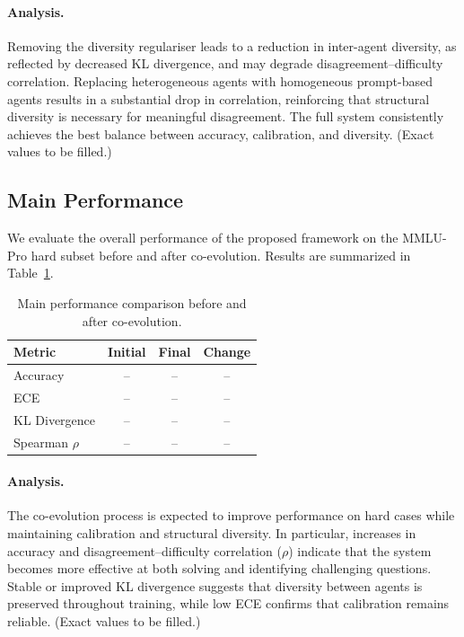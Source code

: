\documentclass{article}
\begin{document}
\paragraph{Analysis.}
Removing the diversity regulariser leads to a reduction in inter-agent diversity, as reflected by decreased KL divergence, and may degrade disagreement–difficulty correlation. Replacing heterogeneous agents with homogeneous prompt-based agents results in a substantial drop in correlation, reinforcing that structural diversity is necessary for meaningful disagreement. The full system consistently achieves the best balance between accuracy, calibration, and diversity. (Exact values to be filled.)

\subsection{Main Performance}

We evaluate the overall performance of the proposed framework on the MMLU-Pro hard subset before and after co-evolution. Results are summarized in Table~\ref{tab:main_performance}.

\begin{table}[h]
\centering
\caption{Main performance comparison before and after co-evolution.}
\label{tab:main_performance}
\begin{tabular}{lccc}
\toprule
\textbf{Metric} & \textbf{Initial} & \textbf{Final} & \textbf{Change} \\
\midrule
Accuracy & -- & -- & -- \\
ECE & -- & -- & -- \\
KL Divergence & -- & -- & -- \\
Spearman $\rho$ & -- & -- & -- \\
\bottomrule
\end{tabular}
\end{table}

\paragraph{Analysis.}
The co-evolution process is expected to improve performance on hard cases while maintaining calibration and structural diversity. In particular, increases in accuracy and disagreement–difficulty correlation ($\rho$) indicate that the system becomes more effective at both solving and identifying challenging questions. Stable or improved KL divergence suggests that diversity between agents is preserved throughout training, while low ECE confirms that calibration remains reliable. (Exact values to be filled.)
\end{document}
